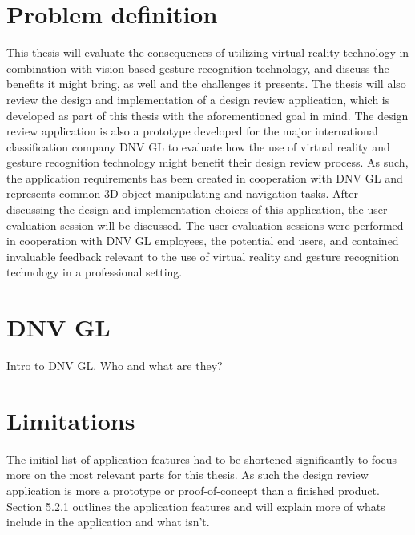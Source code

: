 \section{Problem definition}
This thesis will evaluate the consequences of utilizing virtual reality technology in combination with vision based gesture recognition technology, and discuss the benefits it 
might bring, as well and the challenges it presents. 
The thesis will also review the design and implementation of a design review application, which is developed as part of this thesis with the aforementioned goal in mind. 
The design review application is also a prototype developed for the major international classification company DNV GL to evaluate how the use of virtual reality and gesture
recognition technology might benefit their design review process. As such, the application requirements has been created in cooperation with DNV GL and represents
common 3D object manipulating and navigation tasks. After discussing the design and implementation choices of this application, the user evaluation session will be discussed. 
The user evaluation sessions were performed in cooperation with DNV GL employees, the potential end users, and contained invaluable feedback relevant to the use of virtual reality and gesture
recognition technology in a professional setting. 



\section{DNV GL}
Intro to DNV GL. Who and what are they?

\section{Limitations}
The initial list of application features had to be shortened significantly to focus more on the most relevant parts for this thesis. As such the design review application
is more a prototype or proof-of-concept than a finished product. Section 5.2.1 outlines the application features and will explain more of whats include in the application and what isn't. 

